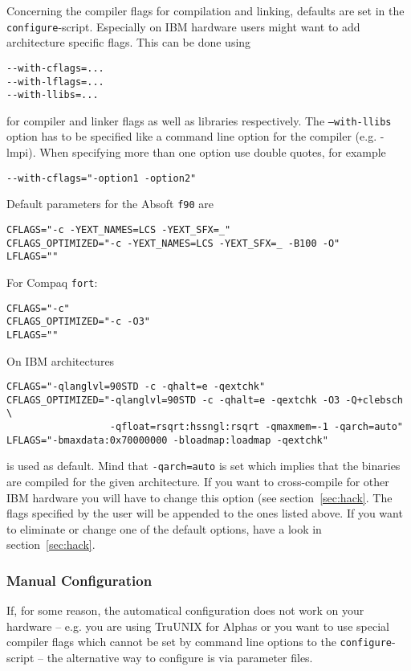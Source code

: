\documentclass[a4paper,10pt]{article}
\begin{document}
Concerning the compiler flags for compilation and linking, defaults are set in
the \texttt{configure}-script.  Especially on IBM hardware users might want to
add architecture specific flags. This can be done using
\begin{verbatim}
--with-cflags=...
--with-lflags=...
--with-llibs=...
\end{verbatim}
for compiler and linker flags as well as libraries respectively. The \texttt{--with-llibs} option has to be specified like a command line option for the compiler (e.g. -lmpi).   When specifying more than one option use double quotes, for example
\begin{verbatim}
--with-cflags="-option1 -option2"
\end{verbatim}
Default parameters for the Absoft \texttt{f90} are
\begin{verbatim}
CFLAGS="-c -YEXT_NAMES=LCS -YEXT_SFX=_"
CFLAGS_OPTIMIZED="-c -YEXT_NAMES=LCS -YEXT_SFX=_ -B100 -O"
LFLAGS=""
\end{verbatim}
For Compaq \texttt{fort}:
\begin{verbatim}
CFLAGS="-c"
CFLAGS_OPTIMIZED="-c -O3"
LFLAGS=""
\end{verbatim}
On IBM architectures 
\begin{verbatim}
CFLAGS="-qlanglvl=90STD -c -qhalt=e -qextchk"
CFLAGS_OPTIMIZED="-qlanglvl=90STD -c -qhalt=e -qextchk -O3 -Q+clebsch \
                  -qfloat=rsqrt:hssngl:rsqrt -qmaxmem=-1 -qarch=auto"
LFLAGS="-bmaxdata:0x70000000 -bloadmap:loadmap -qextchk"
\end{verbatim}
is used as default. Mind that \texttt{-qarch=auto} is set which implies that
the binaries are compiled for the given architecture. If you want to
cross-compile for other IBM hardware you will have to change this option (see
section~\ref{sec:hack}.  The flags specified by the user will be appended to
the ones listed above.  If you want to eliminate or change one of the default
options, have a look in section~\ref{sec:hack}.

\subsubsection*{Manual Configuration}

If, for some reason, the automatical configuration does not work on your
hardware -- e.g. you are using TruUNIX for Alphas or you want to use special
compiler flags which cannot be set by command line options to the
\texttt{configure}-script -- the alternative way to configure is via parameter
files.  
\end{document}
